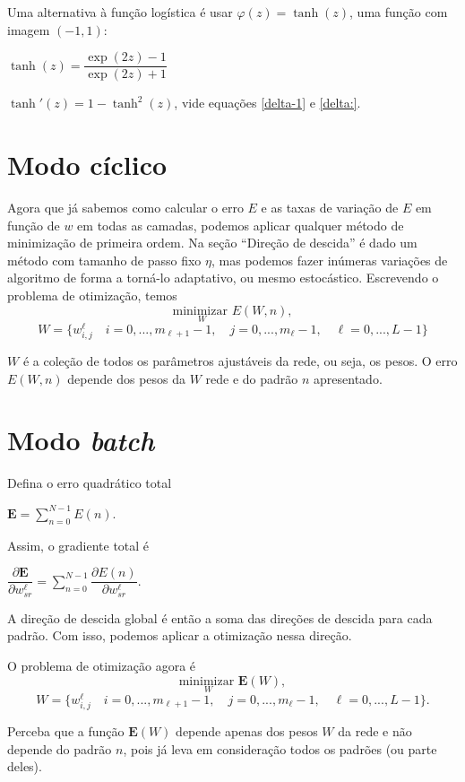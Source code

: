 \documentclass[12pt,a4paper]{article}
\def\bfE{\mathbf{E}}
\begin{document}
Uma alternativa à função logística é usar $\varphi(z)=\tanh(z)$, uma função com imagem $(-1,1)$:

$
\tanh(z) = \dfrac{\exp(2z)-1}{\exp(2z)+1}
$

$
\tanh'(z) = 1 - \tanh^2(z)
$, vide equações \eqref{delta-1} e \eqref{delta:}.


\section{Modo cíclico}
Agora que já sabemos como calcular o erro $E$ e as taxas de variação de $E$ em função de $w$ em todas as camadas, podemos aplicar qualquer método de minimização de primeira ordem. Na seção ``Direção de descida'' é dado um método com tamanho de passo fixo $\eta$, mas podemos fazer inúmeras variações de algoritmo de forma a torná-lo adaptativo, ou mesmo estocástico. Escrevendo o problema de otimização, temos
\[
\underset{W}{\mbox{minimizar }} E(W,n),
\]
\[
 W=\big\{w^\ell_{i,j}
 \quad i=0,...,m_{\ell+1}-1, \quad j=0,...,m_\ell-1,\quad \ell=0,...,L-1
\big\}
\]

$W$ é a coleção de todos os parâmetros ajustáveis da rede, ou seja, os pesos. O erro $E(W,n) $ depende dos pesos da $W$ rede e do padrão $n$ apresentado.

\section{Modo \textit{batch}}
Defina o erro quadrático total

$\displaystyle
\bfE = \sum_{n=0}^{N-1} E(n).
$

\noindent Assim, o gradiente total é

$\displaystyle
\dfrac{\partial \bfE}{\partial w^{\ell}_{sr}} = \sum_{n=0}^{N-1} \dfrac{\partial E(n)}{\partial w^{\ell}_{sr}}.
$

\noindent A direção de descida global é então a soma das direções de descida para cada padrão. Com isso, podemos aplicar a otimização nessa direção.

O problema de otimização agora é
\[
\underset{W}{\mbox{minimizar }} \bfE(W),
\]
\[
 W=\big\{w^\ell_{i,j}
 \quad i=0,...,m_{\ell+1}-1, \quad j=0,...,m_\ell-1,\quad \ell=0,...,L-1
\big\}.
\]

Perceba que a função $\bfE(W)$ depende apenas dos pesos $W$ da rede e não depende do padrão $n$, pois já leva em consideração todos os padrões (ou parte deles).
\end{document}
